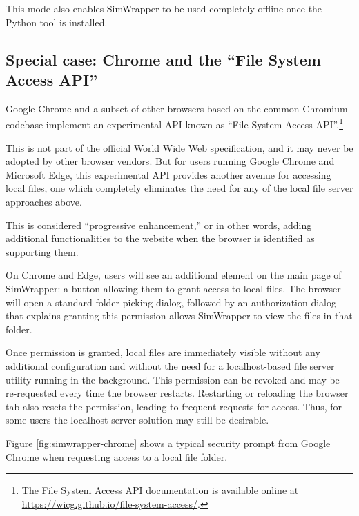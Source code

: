 This mode also enables SimWrapper to be used completely offline once the Python tool is installed.


\hypertarget{simwrapper-special-case-chrome-and-the-file-system-access-api}{%
\subsection{Special case: Chrome and the ``File System Access API''}
\label{simwrapper-special-case-chrome-and-the-file-system-access-api}}

Google Chrome and a subset of other browsers based on the common Chromium codebase implement an experimental API known as ``File System Access API''.\footnote{The File System Access API documentation is available online at \url{https://wicg.github.io/file-system-access/}.}

This is not part of the official World Wide Web specification, and it may never be adopted by other browser vendors. But for users running Google Chrome and Microsoft Edge, this experimental API provides another avenue for accessing local files, one which completely eliminates the need for any of the local file server approaches above.

This is considered ``progressive enhancement,'' or in other words, adding additional functionalities to the website when the browser is identified as supporting them.

On Chrome and Edge, users will see an additional element on the main page of SimWrapper: a button allowing them to grant access to local files. The browser will open a standard folder-picking dialog, followed by an authorization dialog that explains granting this permission allows SimWrapper to view the files in that folder.

Once permission is granted, local files are immediately visible without any additional configuration and without the need for a localhost-based file server utility running in the background. This permission can be revoked and may be re-requested every time the browser restarts. Restarting or reloading the browser tab also resets the permission, leading to frequent requests for access. Thus, for some users the localhost server solution may still be desirable.

Figure \ref{fig:simwrapper-chrome} shows a typical security prompt from Google Chrome when requesting access to a local file folder.

